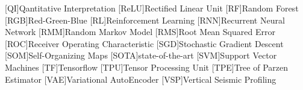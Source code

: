 \begin{acronym}[DCGANS]
[QI]{Qantitative Interpretation}
[ReLU]{Rectified Linear Unit}
[RF]{Random Forest}
[RGB]{Red-Green-Blue}
[RL]{Reinforcement Learning}
[RNN]{Recurrent Neural Network}
[RMM]{Random Markov Model}
[RMS]{Root Mean Squared Error}
[ROC]{Receiver Operating Characteristic}
[SGD]{Stochastic Gradient Descent}
[SOM]{Self-Organizing Maps}
[SOTA]{state-of-the-art}
[SVM]{Support Vector Machines}
[TF]{Tensorflow}
[TPU]{Tensor Processing Unit}
[TPE]{Tree of Parzen Estimator}
[VAE]{Variational AutoEncoder}
[VSP]{Vertical Seismic Profiling}
\end{acronym}

